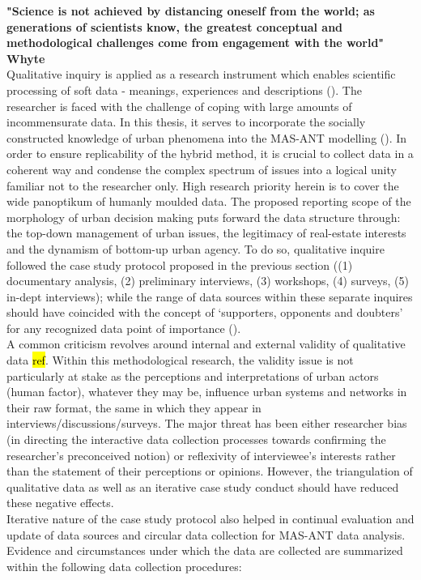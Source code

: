 \documentclass[11pt]{report}
\begin{document}
\textbf{"Science is not achieved  by distancing oneself from  the world; as  generations of scientists  know,  the greatest conceptual and methodological challenges come from  engagement with the world" Whyte}
\\
Qualitative inquiry is applied as a research instrument which enables scientific processing of soft data - meanings, experiences and descriptions (\cite{(Yin, 1994)}). The researcher is faced with the challenge of coping with large amounts of incommensurate data. In this thesis, it serves to incorporate the socially constructed knowledge of urban phenomena into the MAS-ANT modelling (\cite{(Mertens 1998, Flick 2002, Grubovic)}).
In order to ensure replicability of the hybrid method, it is crucial to collect data in a coherent way and condense the complex spectrum of issues into a logical unity familiar not to the researcher only. High research priority herein is to cover the wide panoptikum of humanly moulded data. The proposed reporting scope of the morphology of urban decision making puts forward the data structure through: the top-down management of urban issues, the legitimacy of real-estate interests and the dynamism of bottom-up urban agency. To do so, qualitative inquire followed the case study protocol proposed in the previous section ((1) documentary analysis, (2) preliminary interviews, (3) workshops, (4) surveys, (5) in-dept interviews); while the range of data sources within these separate inquires should have coincided with the concept of ‘supporters, opponents and doubters’ for any recognized data point of importance (\cite{(Pettigrew XXXX, Harrison 2002)}). 
\\
A common criticism revolves around internal and external validity of qualitative data \hl{ref}. Within this methodological research, the validity issue is not particularly at stake as the perceptions and interpretations of urban actors (human factor), whatever they may be, influence urban systems and networks in their raw format, the same in which they appear in interviews/discussions/surveys. The major threat has been either researcher bias (in directing the interactive data collection processes towards confirming the researcher's preconceived notion) or reflexivity of interviewee's interests rather than the statement of their perceptions or opinions. However, the triangulation of qualitative data as well as an iterative case study conduct should have reduced these negative effects.
\\
Iterative nature of the case study protocol also helped in continual evaluation and update of data sources and circular data collection for MAS-ANT data analysis. Evidence and circumstances under which the data are collected are summarized within the following data collection procedures: 
\end{document}
